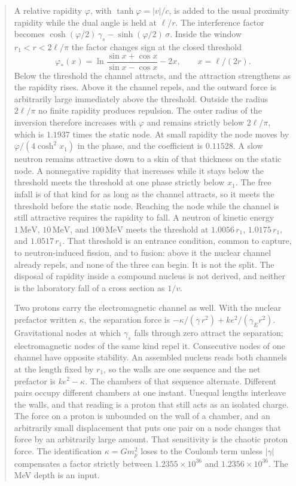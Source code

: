 \documentclass[a4paper]{article}
\begin{document}
\begin{abstract}
A relative rapidity \(\varphi\), with \(\tanh\varphi=|v|/c\), is added to the usual proximity rapidity while the dual angle is held at \(\ell/r\). The interference factor becomes \(\cosh(\varphi/2)\,\gamma_s-\sinh(\varphi/2)\,\sigma\). Inside the window \(r_1<r<2\ell/\pi\) the factor changes sign at the closed threshold
\[
\varphi_*(x)=\ln\frac{\sin x+\cos x}{\sin x-\cos x}-2x,
\qquad x=\ell/(2r).
\]
Below the threshold the channel attracts, and the attraction strengthens as the rapidity rises. Above it the channel repels, and the outward force is arbitrarily large immediately above the threshold. Outside the radius \(2\ell/\pi\) no finite rapidity produces repulsion. The outer radius of the inversion therefore increases with \(\varphi\) and remains strictly below \(2\ell/\pi\), which is \(1.1937\) times the static node. At small rapidity the node moves by \(\varphi/(4\cosh^2 x_1)\) in the phase, and the coefficient is \(0.11528\). A slow neutron remains attractive down to a skin of that thickness on the static node. A nonnegative rapidity that increases while it stays below the threshold meets the threshold at one phase strictly below \(x_1\). The free infall is of that kind for as long as the channel attracts, so it meets the threshold before the static node. Reaching the node while the channel is still attractive requires the rapidity to fall. A neutron of kinetic energy \(1\,\mathrm{MeV}\), \(10\,\mathrm{MeV}\), and \(100\,\mathrm{MeV}\) meets the threshold at \(1.0056\,r_1\), \(1.0175\,r_1\), and \(1.0517\,r_1\). That threshold is an entrance condition, common to capture, to neutron-induced fission, and to fusion: above it the nuclear channel already repels, and none of the three can begin. It is not the split. The disposal of rapidity inside a compound nucleus is not derived, and neither is the laboratory fall of a cross section as \(1/v\).

Two protons carry the electromagnetic channel as well. With the nuclear prefactor written \(\kappa\), the separation force is \(-\kappa/(\gamma\,r^2)+k e^2/(\gamma_E r^2)\). Gravitational nodes at which \(\gamma_s\) falls through zero attract the separation; electromagnetic nodes of the same kind repel it. Consecutive nodes of one channel have opposite stability. An assembled nucleus reads both channels at the length fixed by \(r_1\), so the walls are one sequence and the net prefactor is \(ke^{2}-\kappa\). The chambers of that sequence alternate. Different pairs occupy different chambers at one instant. Unequal lengths interleave the walls, and that reading is a proton that still acts as an isolated charge. The force on a proton is unbounded on the wall of a chamber, and an arbitrarily small displacement that puts one pair on a node changes that force by an arbitrarily large amount. That sensitivity is the chaotic proton force. The identification \(\kappa=G m_p^2\) loses to the Coulomb term unless \(|\gamma|\) compensates a factor strictly between \(1.2355\times 10^{36}\) and \(1.2356\times 10^{36}\). The MeV depth is an input.


\end{abstract}
\end{document}
